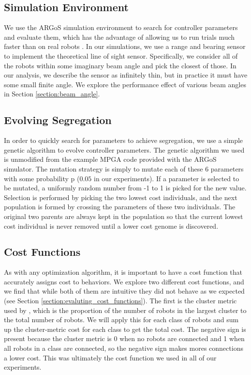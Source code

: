 \documentclass[conference]{IEEEtran}
\begin{document}
  \subsection{Simulation Environment}

    We use the ARGoS simulation environment to search for controller parameters and evaluate them, which has the advantage of allowing us to run trials much faster than on real robots \cite{pinciroli_argos:_2012}. In our simulations, we use a range and bearing sensor to implement the theoretical line of sight sensor. Specifically, we consider all of the robots within some imaginary beam angle and pick the closest of those. In our analysis, we describe the sensor as infinitely thin, but in practice it must have some small finite angle. We explore the performance effect of various beam angles in Section \ref{section:beam_angle}.

  \subsection{Evolving Segregation}

    In order to quickly search for parameters to achieve segregation, we use a simple genetic algorithm to evolve controller parameters. The genetic algorithm we used is unmodified from the example MPGA code provided with the ARGoS simulator. The mutation strategy is simply to mutate each of these 6 parameters with some probability p ($0.05$ in our experiments). If a parameter is selected to be mutated, a uniformly random number from -1 to 1 is picked for the new value. Selection is performed by picking the two lowest cost individuals, and the next population is formed by crossing the parameters of these two individuals. The original two parents are always kept in the population so that the current lowest cost individual is never removed until a lower cost genome is discovered.

  \subsection{Cost Functions}

    As with any optimization algorithm, it is important to have a cost function that accurately assigns cost to behaviors. We explore two different cost functions, and we find that while both of them are intuitive they did not behave as we expected (see Section \ref{section:evaluting_cost_functions}). The first is the cluster metric used by \cite{gauci_self-organized_2014}, which is the proportion of the number of robots in the largest cluster to the total number of robots. We will apply this for each class of robots and sum up the cluster-metric cost for each class to get the total cost. The negative sign is present because the cluster metric is 0 when no robots are connected and 1 when all robots in a class are connected, so the negative sign makes mores connections a lower cost. This was ultimately the cost function we used in all of our experiments.
\end{document}
